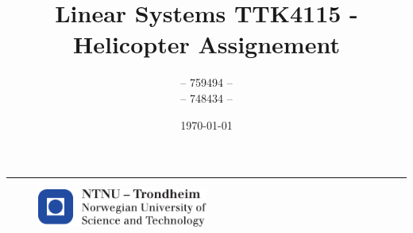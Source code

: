 \documentclass{article}
\title{Linear Systems TTK4115 - Helicopter Assignement}
\author{-- 759494 -- \\  -- 748434 -- }
\date{\today}%
\begin{document}
\begin{titlepage}
    \maketitle
    \rule{\linewidth}{0.5mm}
    
    
    \begin{figure}
    \centering
    \includegraphics[width=0.5\textwidth]{logontnu_eng}
    \end{figure}
    \thispagestyle{empty}
\end{titlepage}

\tableofcontents
\thispagestyle{empty} %
\newpage    


\setcounter{page}{1}




%

\newpage 

\end{document}

